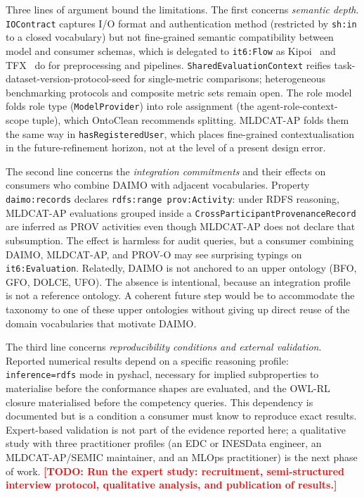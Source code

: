 \documentclass[Afour,sagev,times]{sagej}
\newcommand{\code}[1]{\texttt{#1}}
\newcommand{\TODO}[1]{\textcolor{red}{\textbf{[TODO: #1]}}}
\begin{document}
Three lines of argument bound the limitations. The first concerns \emph{semantic depth}. \code{IOContract} captures I/O format and authentication method (restricted by \code{sh:in} to a closed vocabulary) but not fine-grained semantic compatibility between model and consumer schemas, which is delegated to \code{it6:Flow} as Kipoi~\cite{kipoi} and TFX~\cite{tfx} do for preprocessing and pipelines. \code{SharedEvaluationContext} reifies task-dataset-version-protocol-seed for single-metric comparisons; heterogeneous benchmarking protocols and composite metric sets remain open. The role model folds role type (\code{ModelProvider}) into role assignment (the agent-role-context-scope tuple), which OntoClean recommends splitting. MLDCAT-AP folds them the same way in \code{hasRegisteredUser}, which places fine-grained contextualisation in the future-refinement horizon, not at the level of a present design error.

The second line concerns the \emph{integration commitments} and their effects on consumers who combine DAIMO with adjacent vocabularies. Property \code{daimo:records} declares \code{rdfs:range~prov:Activity}: under RDFS reasoning, MLDCAT-AP evaluations grouped inside a \code{CrossParticipantProvenanceRecord} are inferred as PROV activities even though MLDCAT-AP does not declare that subsumption. The effect is harmless for audit queries, but a consumer combining DAIMO, MLDCAT-AP, and PROV-O may see surprising typings on \code{it6:Evaluation}. Relatedly, DAIMO is not anchored to an upper ontology (BFO, GFO, DOLCE, UFO). The absence is intentional, because an integration profile is not a reference ontology. A coherent future step would be to accommodate the taxonomy to one of these upper ontologies without giving up direct reuse of the domain vocabularies that motivate DAIMO.

The third line concerns \emph{reproducibility conditions and external validation}. Reported numerical results depend on a specific reasoning profile: \code{inference=rdfs} mode in pyshacl, necessary for implied subproperties to materialise before the conformance shapes are evaluated, and the OWL-RL closure materialised before the competency queries. This dependency is documented but is a condition a consumer must know to reproduce exact results. Expert-based validation is not part of the evidence reported here; a qualitative study with three practitioner profiles (an EDC or INESData engineer, an MLDCAT-AP/SEMIC maintainer, and an MLOps practitioner) is the next phase of work. \TODO{Run the expert study: recruitment, semi-structured interview protocol, qualitative analysis, and publication of results.}
\end{document}
